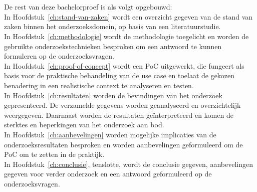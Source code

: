 \section{}%
\label{sec:opzet-bachelorproef}

De rest van deze bachelorproef is als volgt opgebouwd:
\\[1em]
In Hoofdstuk~\ref{ch:stand-van-zaken} wordt een overzicht gegeven van de stand van zaken binnen het onderzoeksdomein, op basis van een literatuurstudie.
\\[1em]
In Hoofdstuk~\ref{ch:methodologie} wordt de methodologie toegelicht en worden de gebruikte onderzoekstechnieken besproken om een antwoord te kunnen formuleren op de onderzoeksvragen.
\\[1em]
In Hoofdstuk~\ref{ch:proof-of-concept} wordt een PoC uitgewerkt, die fungeert als basis voor de praktische behandeling van de use case en toelaat de gekozen benadering in een realistische context te analyseren en testen.
\\[1em]
In Hoofdstuk~\ref{ch:resultaten} worden de bevindingen van het onderzoek gepresenteerd. De verzamelde gegevens worden geanalyseerd en overzichtelijk weergegeven. Daarnaast worden de resultaten geïnterpreteerd en komen de sterktes en beperkingen van het onderzoek aan bod.
\\[1em]
In Hoofdstuk~\ref{ch:aanbevelingen} worden mogelijke implicaties van de onderzoeksresultaten besproken en worden aanbevelingen geformuleerd om de PoC om te zetten in de praktijk.
\\[1em]
In Hoofdstuk~\ref{ch:conclusie}, tenslotte, wordt de conclusie gegeven, aanbevelingen gegeven voor verder onderzoek en een antwoord geformuleerd op de onderzoeksvragen.